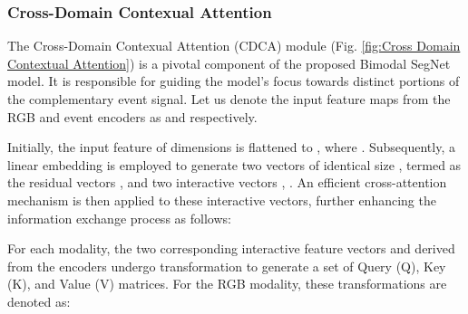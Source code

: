 \documentclass[lettersize,journal]{IEEEtran}
\begin{document}
\subsubsection{ \textbf{Cross-Domain Contexual Attention }}
\label{subsubsection : Cross-Domain Contexual Attention}


The Cross-Domain Contexual Attention (CDCA) module (Fig. \ref{fig:Cross Domain Contextual Attention}) is a pivotal component of the proposed Bimodal SegNet model. It is responsible for guiding the model's focus towards distinct portions of the complementary event signal. Let us denote the input feature maps from the RGB and event encoders as  and  respectively.

Initially, the input feature of dimensions  is flattened to , where . Subsequently, a linear embedding is employed to generate two vectors of identical size , termed as the residual vectors ,  and two interactive vectors , . An efficient cross-attention mechanism is then applied to these interactive vectors, further enhancing the information exchange process as follows:


\begin{figure*}[t!]
\caption{\footnotesize
{ Cross Domain Contextual Attention - The Bimodal SegNet utilizes Cross-Domain Contextual Attention (CDCA) to guide its focus on distinct portions of the signal, using input features from RGB and event encoders. The model employs an attention mechanism between the linearly embedded residual and interactive vectors. With each modality generating Query, Key, and Value matrices, a cross-attention process forms attended results. These results, along with the residual vectors, are then concatenated to create attention-augmented features, which combine with original features to produce enhanced representations. The final output is a fusion of information from both modalities, passed through a 1x1 convolution for consolidated, fused features.   }
}
\label{fig:Cross Domain Contextual Attention}
\end{figure*}


For each modality, the two corresponding interactive feature vectors  and  derived from the encoders undergo transformation to generate a set of Query (Q), Key (K), and Value (V) matrices. For the RGB modality, these transformations are denoted as:
\end{document}
